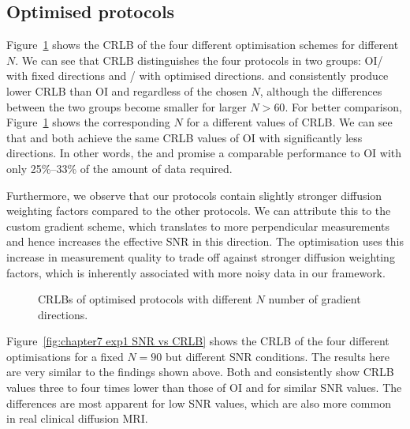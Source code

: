 \subsection{Optimised protocols}
Figure~\ref{fig:chapter7 exp1 DIRS vs CRLB} shows the CRLB of the four different optimisation schemes for different $N$. We can see that CRLB distinguishes the four protocols in two groups: {\gls{OI}}/{\SD} with fixed directions and {\DO}/{\FD} with optimised directions. {\DO} and {\FD} consistently produce lower CRLB than {\gls{OI}} and {\SD} regardless of the chosen $N$, although the differences between the two groups become smaller for larger $N > 60$. For better comparison, Figure~\ref{fig:chapter7 exp1 DIRS vs CRLB} shows the corresponding $N$ for a different values of CRLB. We can see that {\FD} and {\DO} both achieve the same CRLB values of {\gls{OI}} with significantly less directions. In other words, the {\DO} and {\FD} promise a comparable performance to {\gls{OI}} with only 25\%--33\% of the amount of data required.

Furthermore, we observe that our {\FD} protocols contain slightly stronger diffusion weighting factors compared to the other protocols. We can attribute this to the custom gradient scheme, which translates to more perpendicular measurements and hence increases the effective SNR in this direction. The optimisation uses this increase in measurement quality to trade off against stronger diffusion weighting factors, which is inherently associated with more noisy data in our framework.
\begin{figure}[H]
	\centering
	
	\caption{CRLBs of optimised protocols with different $N$  number of gradient directions.}
	\label{fig:chapter7 exp1 DIRS vs CRLB}
\end{figure}

Figure~\ref{fig:chapter7 exp1 SNR vs CRLB} shows the CRLB of the four different optimisations for a fixed $N=90$ but different \gls{SNR} conditions. The results here are very similar to the findings shown above. Both {\FD} and {\DO} consistently show CRLB values three to four times lower than those of {\gls{OI}} and {\SD} for similar \gls{SNR} values. The differences are most apparent for low \gls{SNR} values, which are also more common in real clinical diffusion MRI.

